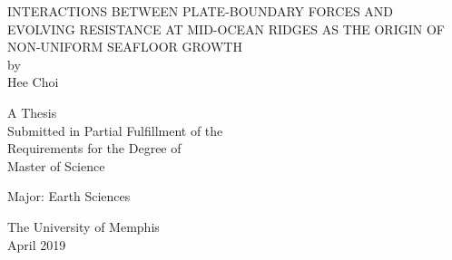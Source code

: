 \begin{titlepage}

\vspace*{.66in}
\begin{center}\uppercase{
 Interactions between plate-boundary forces and evolving resistance at mid-ocean ridges as the origin of non-uniform seafloor growth
}\vspace{2em}\\  %
by\\
\vspace{2em}  %
Hee Choi

\vspace{1.5in}
A Thesis \\
\vspace{14pt}
Submitted in Partial Fulfillment of the\\ \vspace{14pt}
Requirements for the Degree of\\ \vspace{14pt}
Master of Science
\vspace{0.5in}

Major: Earth Sciences

\vspace{1.66in}
The University of Memphis \\
\vspace{14pt}
April 2019
\end{center}

\end{titlepage} 
